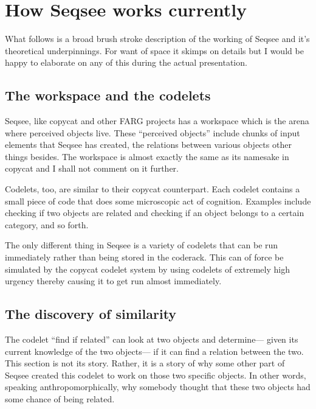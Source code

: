 %

\section{How Seqsee works currently}
\label{sec:how}

What follows is a broad brush stroke description of the working of Seqsee and it's theoretical underpinnings.  For want of space it skimps on details but I would be happy to elaborate on any of this during the actual presentation.

\subsection{The workspace and the codelets}

Seqsee, like copycat and other FARG projects has a workspace which is the arena where perceived objects live.  These ``perceived objects'' include chunks of input elements that Seqsee has created, the relations between various objects other things besides.  The workspace is almost exactly the same as its namesake in copycat and I shall not comment on it further.

Codelets, too, are similar to their copycat counterpart. Each codelet contains a small piece of code that does some microscopic act of cognition.  Examples include checking if two objects are related and checking if an object belongs to a certain category, and so forth.

The only different thing in Seqsee is a variety of codelets that can be run immediately rather than being stored in the coderack.  This can of force be simulated by the copycat codelet system by using codelets of extremely high urgency thereby causing it to get run almost immediately.

\subsection{The discovery of similarity}

The codelet ``find if related'' can look at two objects and determine--- given its current knowledge of the two objects--- if it can find a relation between the two.  This section is not its story.  Rather, it is a story of why some other part of Seqsee created this codelet to work on those two specific objects.  In other words, speaking anthropomorphically, why somebody thought that these two objects had some chance of being related.

